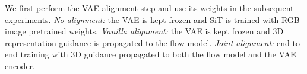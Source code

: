 \begin{table}[htbp]
\caption{3D Representation Alignment and End-to-end Training.}
\vspace{-0.2cm}
\centering
\small
{}
\hspace{-0.3cm}
\begin{tablenotes}[para]
    \footnotesize 
     We first perform the VAE alignment step and use its weights in the subsequent experiments. \textit{No alignment:} the VAE is kept frozen and SiT is trained with RGB image pretrained weights. \textit{Vanilla alignment:} the VAE is kept frozen and 3D representation guidance is propagated to the flow model. \textit{Joint alignment:} end-to-end training with 3D guidance propagated to both the flow model and the VAE encoder.
\end{tablenotes}
\label{tab:abl_repas}
\end{table}
